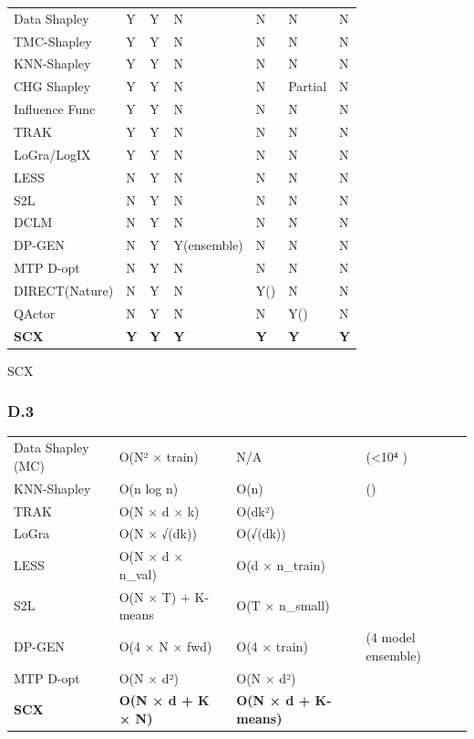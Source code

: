 \documentclass[
  12pt,
]{article}
\begin{document}
\begin{longtable}[]{@{}lllllll@{}}
\toprule\noalign{}
 &  &  &  &  &  &  \\
\midrule\noalign{}
\endhead
\bottomrule\noalign{}
\endlastfoot
Data Shapley & Y & Y & N & N & N & N \\
TMC-Shapley & Y & Y & N & N & N & N \\
KNN-Shapley & Y & Y & N & N & N & N \\
CHG Shapley & Y & Y & N & N & Partial & N \\
Influence Func & Y & Y & N & N & N & N \\
TRAK & Y & Y & N & N & N & N \\
LoGra/LogIX & Y & Y & N & N & N & N \\
LESS & N & Y & N & N & N & N \\
S2L & N & Y & N & N & N & N \\
DCLM & N & Y & N & N & N & N \\
DP-GEN & N & Y & Y(ensemble) & N & N & N \\
MTP D-opt & N & Y & N & N & N & N \\
DIRECT(Nature) & N & Y & N & Y() & N & N \\
QActor & N & Y & N & N & Y() & N \\
\textbf{SCX} & \textbf{Y} & \textbf{Y} & \textbf{Y} & \textbf{Y} &
\textbf{Y} & \textbf{Y} \\
\end{longtable}

SCX \textbf{}

\subsubsection{D.3
}\label{d.3-ux8ba1ux7b97ux590dux6742ux5ea6ux6bd4ux8f83}

\begin{longtable}[]{@{}llll@{}}
\toprule\noalign{}
 &  &  &  \\
\midrule\noalign{}
\endhead
\bottomrule\noalign{}
\endlastfoot
Data Shapley (MC) & O(N² × train) & N/A &  (\textless10⁴ ) \\
KNN-Shapley & O(n log n) & O(n) &  () \\
TRAK & O(N × d × k) & O(dk²) &  \\
LoGra & O(N × √(dk)) & O(√(dk)) &  \\
LESS & O(N × d × n\_val) & O(d × n\_train) &  \\
S2L & O(N × T) + K-means & O(T × n\_small) &  \\
DP-GEN & O(4 × N × fwd) & O(4 × train) &  (4 model ensemble) \\
MTP D-opt & O(N × d²) & O(N × d²) &  \\
\textbf{SCX} & \textbf{O(N × d + K × N)} & \textbf{O(N × d + K-means)} &
\textbf{} \\
\end{longtable}
\end{document}
